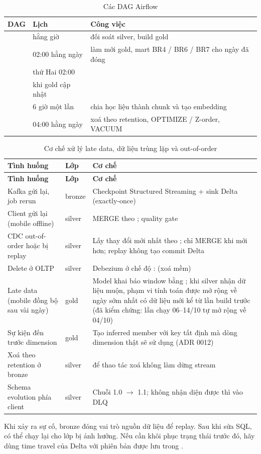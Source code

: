 \begin{table}[H]
\centering\small
\caption{Các DAG Airflow}\label{tab:dags}
\begin{tabularx}{\textwidth}{@{}L{3.7cm}L{2.6cm}Y@{}}
\toprule
\textbf{DAG} & \textbf{Lịch} & \textbf{Công việc} \\
\midrule
{} & hằng giờ & đối soát silver, build gold \\
 & 02:00 hằng ngày & làm mới gold, mart BR4 / BR6 / BR7 cho ngày đã đóng \\
 & thứ Hai 02:00 &  \\
 & khi gold cập nhật &  \\
 & 6 giờ một lần & chia học liệu thành chunk và tạo embedding \\
 & 04:00 hằng ngày & xoá theo retention, OPTIMIZE / Z-order, VACUUM \\
\bottomrule
\end{tabularx}
\end{table}

{\small
\begin{longtable}{@{}L{4.4cm}L{1.6cm}L{8.6cm}@{}}
\caption{Cơ chế xử lý late data, dữ liệu trùng lặp và out-of-order}\label{tab:late}\\
\toprule
\textbf{Tình huống} & \textbf{Lớp} & \textbf{Cơ chế} \\
\midrule
\endfirsthead
\toprule
\textbf{Tình huống} & \textbf{Lớp} & \textbf{Cơ chế} \\
\midrule
\endhead
Kafka gửi lại, job rerun & bronze & Checkpoint Structured Streaming + sink Delta (exactly-once) \\
Client gửi lại (mobile offline) & silver & MERGE theo ; quality gate  \\
CDC out-of-order hoặc bị replay & silver & Lấy thay đổi mới nhất theo ; chỉ MERGE khi  mới hơn; replay không tạo commit Delta \\
Delete ở OLTP & silver & Debezium ở chế độ :  (xoá mềm) \\
Late data (mobile đồng bộ sau vài ngày) & gold & Model khai báo window bằng ; khi silver nhận dữ liệu muộn, phạm vi tính toán được mở rộng về ngày sớm nhất có dữ liệu mới kể từ lần build trước (đã kiểm chứng: lần chạy 06--14/10 tự mở rộng về 04/10) \\
Sự kiện đến trước dimension & gold & Tạo inferred member với key tất định mà dòng dimension thật sẽ sử dụng (ADR 0012) \\
Xoá theo retention ở bronze & silver &  để thao tác xoá không làm dừng stream \\
Schema evolution phía client & silver & Chuỗi  1.0 $\rightarrow$ 1.1; không nhận diện được thì vào DLQ \\
\bottomrule
\end{longtable}}

Khi xảy ra sự cố, bronze đóng vai trò nguồn dữ liệu để replay. Sau khi sửa SQL, có thể chạy lại  cho lớp bị ảnh hưởng. Nếu cần khôi phục trạng thái trước đó, hãy dùng time travel của Delta với phiên bản được lưu trong .
